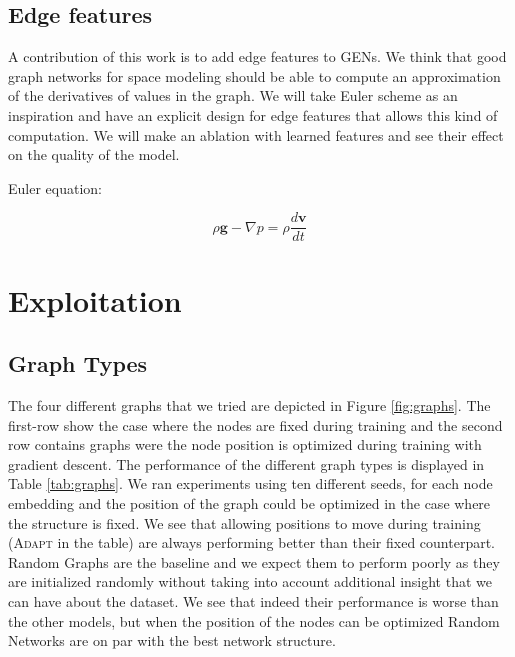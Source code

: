 \documentclass[a4paper,10pt]{article}
\newcommand{\ap}[1]{\marginpar{{\tiny \color{red} [AP] #1}}}
\begin{document}
\subsection{Edge features}
A contribution of this work is to add edge features to GENs. We think that good graph networks for space modeling should be able to compute an approximation of the derivatives of values in the graph. We will take Euler scheme as an inspiration and have an explicit design for edge features that allows this kind of computation. We will make an ablation with learned features and see their effect on the quality of the model.


\ap{TODO: sketch}
Euler equation:

\begin{equation}
  \rho \mathbf{g} - \nabla p = \rho\frac{d\mathbf{v}}{dt}
\end{equation}


\section{Exploitation}

\subsection{Graph Types}

The four different graphs that we tried are depicted in Figure \ref{fig:graphs}. The first-row show the case where the nodes are fixed during training and the second row contains graphs were the node position is optimized during training with gradient descent.
The performance of the different graph types is displayed in Table \ref{tab:graphs}. We ran experiments using ten different seeds, for each node embedding and the position of the graph could be optimized in the case where the structure is fixed.
We see that allowing positions to move during training (\textsc{Adapt} in the table) are always performing better than their fixed counterpart. Random Graphs are the baseline and we expect them to perform poorly as they are initialized randomly without taking into account additional insight that we can have about the dataset. We see that indeed their performance is worse than the other models, but when the position of the nodes can be optimized Random Networks are on par with the best network structure.
\end{document}
